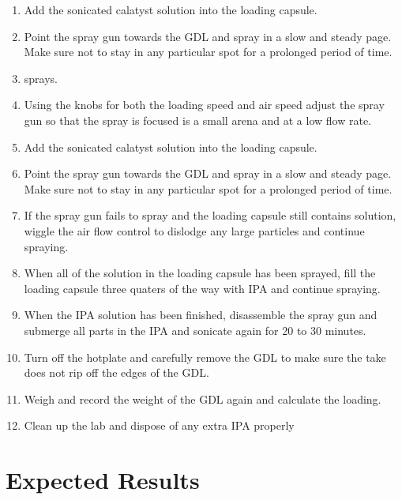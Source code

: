 \documentclass{article}
\begin{document}
\begin{enumerate}
        \item Add the sonicated calatyst solution into the loading capsule.
        \item Point the spray gun towards the GDL and spray in a slow and steady page. Make sure not to stay in any particular spot for a prolonged period of time.
        \item sprays.
        \item Using the knobs for both the loading speed and air speed adjust the spray gun so that the spray is focused is a small arena and at a low flow rate.
        \item Add the sonicated calatyst solution into the loading capsule.
        \item Point the spray gun towards the GDL and spray in a slow and steady page. Make sure not to stay in any particular spot for a prolonged period of time.
        \item If the spray gun fails to spray and the loading capsule still contains solution, wiggle the air flow control to dislodge any large particles and continue spraying.
        \item When all of the solution in the loading capsule has been sprayed, fill the loading capsule three quaters of the way with IPA and continue spraying.
        \item When the IPA solution has been finished, disassemble the spray gun and submerge all parts in the IPA and sonicate again for 20 to 30 minutes.
        \item Turn off the hotplate and carefully remove the GDL to make sure the take does not rip off the edges of the GDL.
        \item Weigh and record the weight of the GDL again and calculate the loading.
        \item Clean up the lab and dispose of any extra IPA properly
			\end{enumerate}
  \section{Expected Results}
\end{document}
